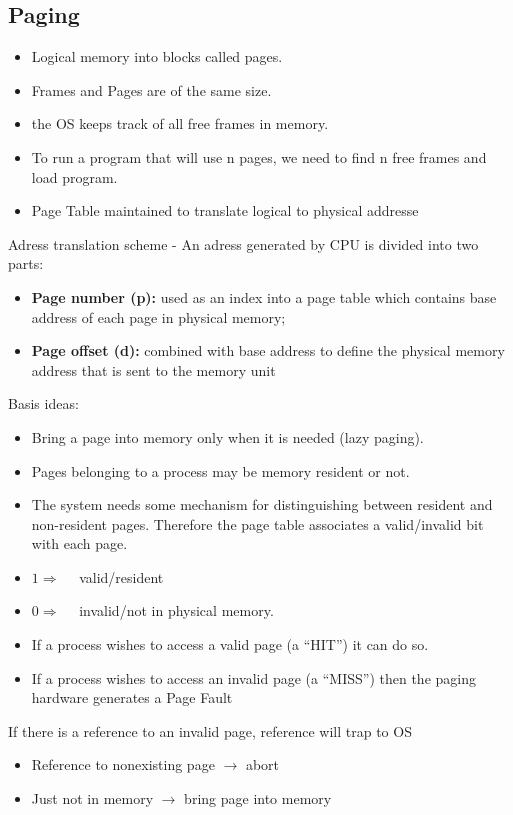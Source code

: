 \documentclass[a4paper, 10pt]{article}
\begin{document}
\subsection{Paging}
\begin{itemize}
    \item Logical memory into blocks called pages.
    \item Frames and Pages are of the same size.
    \item the OS keeps track of all free frames in memory.
    \item To run a program that will use n pages, we need to find n free
          frames and load program.
    \item Page Table maintained to translate logical to physical addresse
\end{itemize}
Adress translation scheme - An adress generated by CPU is divided into two parts:
\begin{itemize}
    \item \textbf{Page number (p):} used as an index into a page table which contains base
          address of each page in physical memory;
    \item \textbf{Page offset (d):} combined with base address to define the physical
          memory address that is sent to the memory unit
\end{itemize}
Basis ideas:
\begin{itemize}
    \item Bring a page into memory only when it is needed (lazy paging).
    \item Pages belonging to a process may be memory resident or not.
    \item  The system needs some mechanism for distinguishing between resident and non-resident pages. Therefore the page table associates
          a valid/invalid bit with each page.
    \item $1 \Longrightarrow \quad $ valid/resident
    \item $0 \Longrightarrow \quad $ invalid/not in physical memory.
    \item If a process wishes to access a valid page (a “HIT”) it can do so.
    \item If a process wishes to access an invalid page (a “MISS”) then the
          paging hardware generates a Page Fault
\end{itemize}
If there is a reference to an invalid page, reference will trap to OS
\begin{itemize}
    \item Reference to nonexisting page $\rightarrow$ abort
    \item Just not in memory $\rightarrow$ bring page into memory
\end{itemize}
\end{document}
